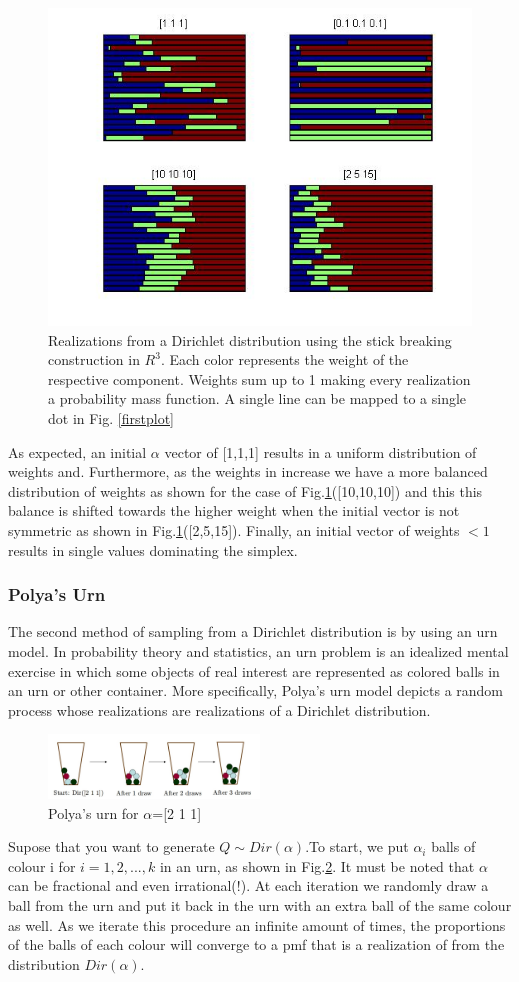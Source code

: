 \documentclass[twoside,hidelinks]{article}
\begin{document}
\begin{figure}[!h]
    \centerline{\includegraphics[width=.55\textwidth]{stickBreaking}}
    \caption{Realizations from a Dirichlet distribution using the stick breaking construction in $R^3$. Each color represents the weight of the respective component. Weights sum up to 1 making every realization a probability mass function. A single line can be mapped to a single dot in Fig. \ref{firstplot}  }
\label{stickR3}
\end{figure}


As expected, an initial $\alpha$ vector of [1,1,1] results in a uniform distribution of weights and. Furthermore, as the weights in increase we have a more balanced distribution of weights as shown for the case of Fig.\ref{stickR3}([10,10,10]) and this this balance is shifted towards the higher weight when the initial vector is not symmetric as shown in Fig.\ref{stickR3}([2,5,15]). Finally, an initial vector of weights $<1$ results in single values dominating the simplex.
\subsubsection{Polya's Urn}

The second method of sampling from a Dirichlet distribution is by using an urn model. In probability theory and statistics, an urn problem is an idealized mental exercise in which some objects of real interest are represented as colored balls in an urn or other container. More specifically, Polya's urn model depicts a random process whose realizations are realizations of a Dirichlet distribution.
\begin{figure}[!h]
    \centerline{\includegraphics[width=0.5\textwidth]{urn}}
	\caption{Polya's urn for $\alpha$=[2 1 1] }
	\label{polysurn}
\end{figure}
Supose that you want to generate $Q \sim Dir( \alpha ) $.To start, we put $\alpha_i$ balls of colour i for $i=1,2,...,k$ in an urn, as shown in Fig.\ref{polysurn}. It must be noted that $\alpha$ can be fractional and even irrational(!). At each iteration we randomly draw a ball from the urn and put it back in the urn with an extra ball of the same colour as well. As we iterate this procedure an infinite amount of times, the proportions of the balls of each colour will converge to a pmf that is a realization of from the distribution $Dir(\alpha)$.
\end{document}
